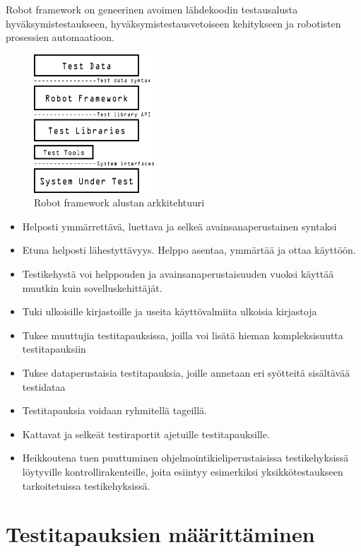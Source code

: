   Robot framework on geneerinen avoimen lähdekoodin testausalusta hyväksymistestaukseen, hyväksymistestausvetoiseen kehitykseen ja robotisten prosessien automaatioon.

  \begin{figure}[H]
    \centering
    \includegraphics[width=0.4\textwidth]{assets/robot-architecture.png}
    \caption{Robot framework alustan arkkitehtuuri}
    \label{fig:robot-architecture}
  \end{figure}

  \begin{itemize}
    \item Helposti ymmärrettävä, luettava ja selkeä avainsanaperustainen syntaksi
    \item Etuna helposti lähestyttävyys. Helppo asentaa, ymmärtää ja ottaa käyttöön.
    \item Testikehystä voi helppouden ja avainsanaperustaisuuden vuoksi käyttää muutkin kuin sovelluskehittäjät.
    \item Tuki ulkoisille kirjastoille ja useita käyttövalmiita ulkoisia kirjastoja
    \item Tukee muuttujia testitapauksissa, joilla voi lisätä hieman kompleksisuutta testitapauksiin
    \item Tukee dataperustaisia testitapauksia, joille annetaan eri syötteitä sisältävää testidataa
    \item Testitapauksia voidaan ryhmitellä tageillä.
    \item Kattavat ja selkeät testiraportit ajetuille testitapauksille.
    \item Heikkoutena tuen puuttuminen ohjelmointikieliperustaisissa testikehyksissä löytyville kontrollirakenteille, joita esiintyy esimerkiksi yksikkötestaukseen tarkoitetuissa testikehyksissä.
  \end{itemize}

\section{Testitapauksien määrittäminen} \label{ch:08_testitapauksien_maarittaminen}

